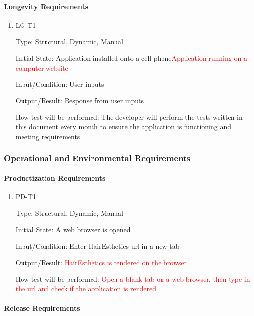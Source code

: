 \documentclass[12pt, titlepage]{article}
\begin{document}
\paragraph{Longevity Requirements}

\begin{enumerate}

\item{LG-T1\\}

Type: Structural, Dynamic, Manual
					
Initial State: \sout{Application installed onto a cell phone}\textcolor{red}{Application running on a computer website}
					
Input/Condition: User inputs
					
Output/Result: Response from user inputs
					
How test will be performed: The developer will perform the tests written in this document every month to ensure the application is functioning and meeting requirements.

\end{enumerate}

\subsubsection{Operational and Environmental Requirements}
		
\paragraph{Productization Requirements}

\begin{enumerate}

\item{PD-T1\\}

Type: Structural, Dynamic, Manual
					
Initial State: A web browser is opened
					
Input/Condition: Enter HairEsthetics url in a new tab
					
Output/Result: \textcolor{red}{HairEsthetics is rendered on the browser}
					
How test will be performed: \textcolor{red}{Open a blank tab on a web browser, then type in the url and check if the application is rendered}

\end{enumerate}

\paragraph{Release Requirements}
\end{document}
